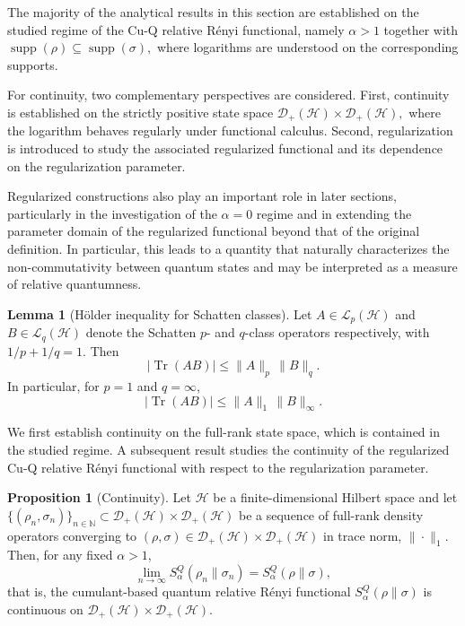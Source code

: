 \documentclass[a4paper, amsfonts, amssymb, amsmath, reprint, showkeys, nofootinbib, twoside, aps, pra]{revtex4-2}
\theoremstyle{definition}
\newtheorem{lemma}{Lemma}
\newtheorem{proposition}[theorem]{Proposition}
\begin{document}
The majority of the analytical results in this section are established on the studied regime of the Cu-Q relative Rényi functional, namely
\(
\alpha>1
\)
together with
\(
\operatorname{supp}(\rho)\subseteq\operatorname{supp}(\sigma),
\)
where logarithms are understood on the corresponding supports.

For continuity, two complementary perspectives are considered. First, continuity is established on the strictly positive state space
\(
\mathcal D_+(\mathcal H)\times\mathcal D_+(\mathcal H),
\)
where the logarithm behaves regularly under functional calculus. Second, regularization is introduced to study the associated regularized functional and its dependence on the regularization parameter.

Regularized constructions also play an important role
in later sections, particularly in the investigation of the \(\alpha=0\) regime and in extending the parameter
domain of the regularized functional beyond that of the
original definition. In particular, this leads to a quantity that naturally characterizes the non-commutativity between quantum states and may be interpreted as a measure of relative quantumness.


\begin{lemma}[H\"{o}lder inequality for Schatten classes]\label{Lem1}
Let $A \in \mathcal{L}_p(\mathcal{H})$ and $B \in \mathcal{L}_q(\mathcal{H})$ denote 
the Schatten $p$- and $q$-class operators respectively, with $1/p + 1/q = 1$.
Then
\begin{equation}
    \big|\operatorname{Tr}(AB)\big| \le \|A\|_p \, \|B\|_q.
\end{equation}
In particular, for $p=1$ and $q=\infty$,
\begin{equation}
    \big|\operatorname{Tr}(AB)\big| \le \|A\|_1 \, \|B\|_\infty.
\end{equation}
\end{lemma}

We first establish continuity on the full-rank state space,
which is contained in the studied regime. A subsequent result studies the continuity of the regularized Cu-Q relative Rényi functional with respect to the regularization parameter.

\begin{proposition}[Continuity]\label{Prop:Continuity}
Let $\mathcal{H}$ be a finite-dimensional Hilbert space and let 
$\{(\rho_n,\sigma_n)\}_{n\in\mathbb{N}} \subset \mathcal{D}_+(\mathcal{H}) \times \mathcal{D}_+(\mathcal{H})$ 
be a sequence of full-rank density operators converging to $(\rho,\sigma) \in \mathcal{D}_+(\mathcal{H}) \times \mathcal{D}_+(\mathcal{H})$ in trace norm, $\|\cdot\|_1$. Then, for any fixed $\alpha>1$,
\begin{equation}
    \lim_{n\to\infty} S^Q_\alpha(\rho_n\|\sigma_n) = S^Q_\alpha(\rho\|\sigma),
\end{equation}
that is, the cumulant-based quantum relative Rényi functional $S^Q_\alpha(\rho\|\sigma)$ is continuous on 
$\mathcal{D}_+(\mathcal{H}) \times \mathcal{D}_+(\mathcal{H})$.
\end{proposition}
\end{document}
